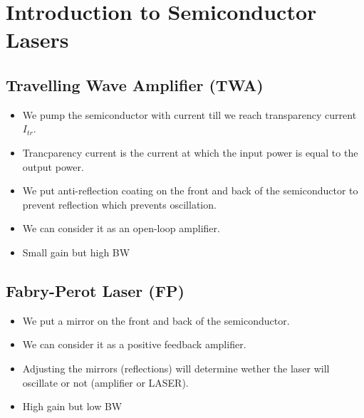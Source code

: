 \documentclass[11pt]{article}
\begin{document}
\section{Introduction to Semiconductor Lasers}
\subsection{Travelling Wave Amplifier (TWA)}
\begin{itemize}
    \item We pump the semiconductor with current till we reach transparency current $I_{tr}$.
    \item Trancparency current is the current at which the input power is equal to the output power.
    \item We put anti-reflection coating on the front and back of the semiconductor to prevent reflection which prevents oscillation.
    \item We can consider it as an open-loop amplifier.
    \item Small gain but high BW
\end{itemize}
\subsection{Fabry-Perot Laser (FP)}
\begin{itemize}
    \item We put a mirror on the front and back of the semiconductor.
    \item We can consider it as a positive feedback amplifier.
    \item Adjusting the mirrors (reflections) will determine wether the laser will oscillate or not (amplifier or LASER).
    \item High gain but low BW
\end{itemize}
\end{document}
